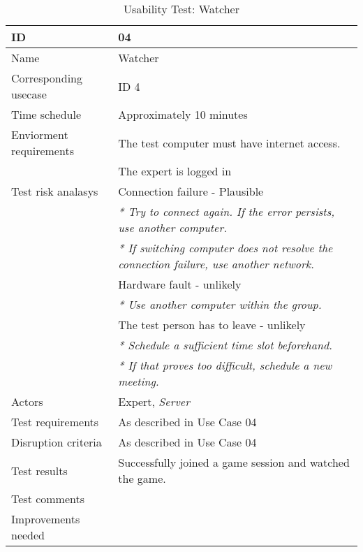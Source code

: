 {\footnotesize
\begin{table}[H]
\begin{tabular}{| p{5cm} | p{10cm} |}\hline
	\textbf{ID}	& \textbf{04} \\ \hline
	Name		& Watcher \\ \hline
	Corresponding usecase & ID 4\\ \hline
	Time schedule	& Approximately 10 minutes\\ \hline
	Enviorment requirements 
		& The test computer must have internet access. \\ 
		& The expert is logged in\\ \hline
	Test risk analasys 
		& Connection failure - Plausible \\
		& \emph{* Try to connect again. If the error persists, use another computer.} \\
		& \emph{* If switching computer does not resolve the connection failure, use another network.}\\
		& Hardware fault - unlikely \\
		& \emph{* Use another computer within the group.} \\
		& The test person has to leave - unlikely \\
		& \emph{* Schedule a sufficient time slot beforehand.} \\
		& \emph{* If that proves too difficult, schedule a new meeting.}\\ \hline
	Actors	& Expert, \emph{Server}\\ \hline
	Test requirements & As described in Use Case 04 \\ \hline
	Disruption criteria & As described in Use Case 04  \\ \hline
	Test results & Successfully joined a game session and watched the game. \\ \hline
	Test comments & \\ \hline
	Improvements needed & \\ \hline
\end{tabular}


\caption{Usability Test: Watcher}
\label{fig:usability_test_4}
\end{table}}



